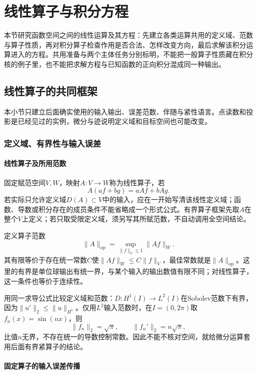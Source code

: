 \section{线性算子与积分方程}
\label{sec:linear-operators-integral-equations}

本节研究函数空间之间的线性运算及其方程：先建立各类运算共用的定义域、范数与算子性质，再对积分算子检查作用是否合法、怎样改变方向，最后求解该积分运算进入的方程。共用准备与两个主体任务分别标明，不能把一般算子性质藏在积分核的例子里，也不能把求解方程与已知函数的正向积分混成同一种输出。

\subsection{线性算子的共同框架}
\label{subsec:operator-framework}

本小节只建立后面确实使用的输入输出、误差范数、伴随与紧性语言。点读数和投影是已经见过的实例，微分与迹说明定义域和目标空间也可能改变。

\subsubsection{定义域、有界性与输入误差}
\label{subsubsec:operator-domain-boundedness}

\paragraph{线性算子及所用范数}

固定赋范空间$V,W$，映射$A:V\to W$称为线性算子，若
\[
A(af+bg)=aAf+bAg.
\]
若实际只允许定义域$D(A)\subset V$中的输入，应在一开始写清该线性定义域；函数、导数或积分存在的成员条件不能省略成一个形式公式。有界算子框架先取$A$在整个$V$上定义；若只取受限定义域，须另写其所赋范数，不自动调用全空间结论。

定义算子范数
\[
\|A\|_{\mathrm{op}}=\sup_{\|f\|_V\le1}\|Af\|_W.
\]
其有限等价于存在统一常数$C$使$\|Af\|_W\le C\|f\|_V$，最佳常数就是$\|A\|_{\mathrm{op}}$。这里的有界是单位球输出有统一界，与某个输入的输出数值有限不同；对线性算子，这一条件也等价于连续性。

用同一求导公式比较定义域和范数：$D:H^1(I)\to L^2(I)$在Sobolev范数下有界，因为$\|u'\|_2\le\|u\|_{H^1}$。仅用$L^2$输入范数时，在$I=(0,2\pi)$取$f_n(x)=\sin(nx)$，则
\[
\|f_n\|_2=\sqrt\pi,\qquad \|f_n'\|_2=n\sqrt\pi,
\]
比值$n$无界，不存在统一的导数控制常数。因此不能不核对空间，就给微分运算套用后面有界紧算子的结论。

\paragraph{固定算子的输入误差传播}

